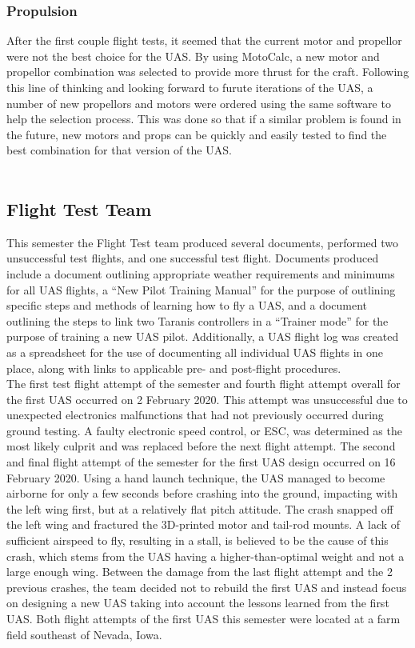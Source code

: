 \documentclass{article}
\begin{document}
\subsubsection{Propulsion}
After the first couple flight tests, it seemed that the current motor and propellor were not the best choice for the UAS. By using MotoCalc, a new motor and propellor combination was selected to provide more thrust for the craft. Following this line of thinking and looking forward to furute iterations of the UAS, a number of new propellors and motors were ordered using the same software to help the selection process. This was done so that if a similar problem is found in the future, new motors and props can be quickly and easily tested to find the best combination for that version of the UAS. \\ \\

\subsection{Flight Test Team}
This semester the Flight Test team produced several documents, performed two unsuccessful test flights, and one successful test flight. Documents produced include a document outlining appropriate weather requirements and minimums for all UAS flights, a “New Pilot Training Manual” for the purpose of outlining specific steps and methods of learning how to fly a UAS, and a document outlining the steps to link two Taranis controllers in a “Trainer mode” for the purpose of training a new UAS pilot. Additionally, a UAS flight log was created as a spreadsheet for the use of documenting all individual UAS flights in one place, along with links to applicable pre- and post-flight procedures.\\

The first test flight attempt of the semester and fourth flight attempt overall for the first UAS occurred on 2 February 2020. This attempt was unsuccessful due to unexpected electronics malfunctions that had not previously occurred during ground testing. A faulty electronic speed control, or ESC, was determined as the most likely culprit and was replaced before the next flight attempt. The second and final flight attempt of the semester for the first UAS design occurred on 16 February 2020. Using a hand launch technique, the UAS managed to become airborne for only a few seconds before crashing into the ground, impacting with the left wing first, but at a relatively flat pitch attitude. The crash snapped off the left wing and fractured the 3D-printed motor and tail-rod mounts. A lack of sufficient airspeed to fly, resulting in a stall, is believed to be the cause of this crash, which stems from the UAS having a higher-than-optimal weight and not a large enough wing. Between the damage from the last flight attempt and the 2 previous crashes, the team decided not to rebuild the first UAS and instead focus on designing a new UAS taking into account the lessons learned from the first UAS. Both flight attempts of the first UAS this semester were located at a farm field southeast of Nevada, Iowa.\\
\end{document}
